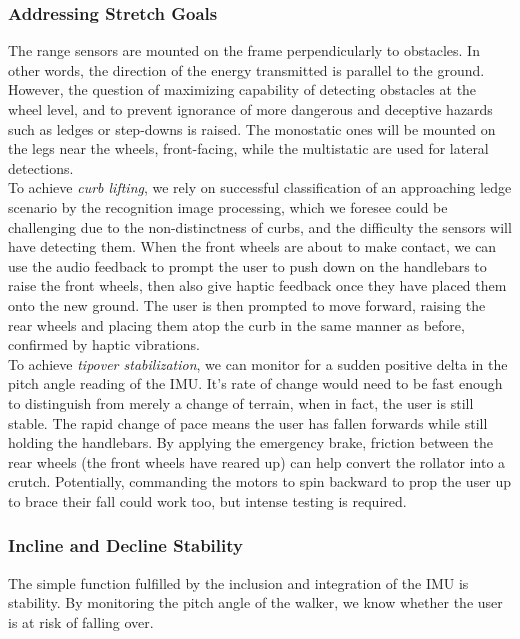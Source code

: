 \subsubsection{Addressing Stretch Goals}
\noindent The range sensors are mounted on the frame perpendicularly to obstacles. In other words, the direction of the energy transmitted is parallel to the ground. However, the question of maximizing capability of detecting obstacles at the wheel level, and to prevent ignorance of more dangerous and deceptive hazards such as ledges or step-downs is raised. The monostatic ones will be mounted on the legs near the wheels, front-facing, while the multistatic are used for lateral detections.\\

\noindent To achieve \textit{curb lifting}, we rely on successful classification of an approaching ledge scenario by the recognition image processing, which we foresee could be challenging due to the non-distinctness of curbs, and the difficulty the sensors will have detecting them. When the front wheels are about to make contact, we can use the audio feedback to prompt the user to push down on the handlebars to raise the front wheels, then also give haptic feedback once they have placed them onto the new ground. The user is then prompted to move forward, raising the rear wheels and placing them atop the curb in the same manner as before, confirmed by haptic vibrations.\\

\noindent To achieve \textit{tipover stabilization}, we can monitor for a sudden positive delta in the pitch angle reading of the IMU. It's rate of change would need to be fast enough to distinguish from merely a change of terrain, when in fact, the user is still stable. The rapid change of pace means the user has fallen forwards while still holding the handlebars. By applying the emergency brake, friction between the rear wheels (the front wheels have reared up) can help convert the rollator into a crutch. Potentially, commanding the motors to spin backward to prop the user up to brace their fall could work too, but intense testing is required.\\

\subsubsection{Incline and Decline Stability}
\noindent The simple function fulfilled by the inclusion and integration of the IMU is stability. By monitoring the pitch angle of the walker, we know whether the user is at risk of falling over.\\

